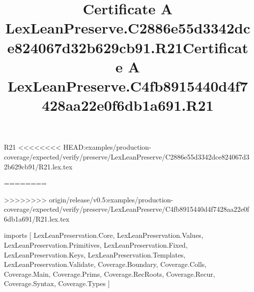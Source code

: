 \begin{lexlean}{R21}
<<<<<<<< HEAD:examples/production-coverage/expected/verify/preserve/LexLeanPreserve/C2886e55d3342dce824067d32b629cb91/R21.lex.tex
\title{Certificate A LexLeanPreserve.C2886e55d3342dce824067d32b629cb91.R21}
========
\title{Certificate A LexLeanPreserve.C4fb8915440d4f7428aa22e0f6db1a691.R21}
>>>>>>>> origin/release/v0.5:examples/production-coverage/expected/verify/preserve/LexLeanPreserve/C4fb8915440d4f7428aa22e0f6db1a691/R21.lex.tex
\begin{coremodule}
imports [
  LexLeanPreservation.Core,
  LexLeanPreservation.Values,
  LexLeanPreservation.Primitives,
  LexLeanPreservation.Fixed,
  LexLeanPreservation.Keys,
  LexLeanPreservation.Templates,
  LexLeanPreservation.Validate,
  Coverage.Boundary,
  Coverage.Colls,
  Coverage.Main,
  Coverage.Prims,
  Coverage.RecRoots,
  Coverage.Recur,
  Coverage.Syntax,
  Coverage.Types
]


\end{coremodule}
\end{lexlean}
